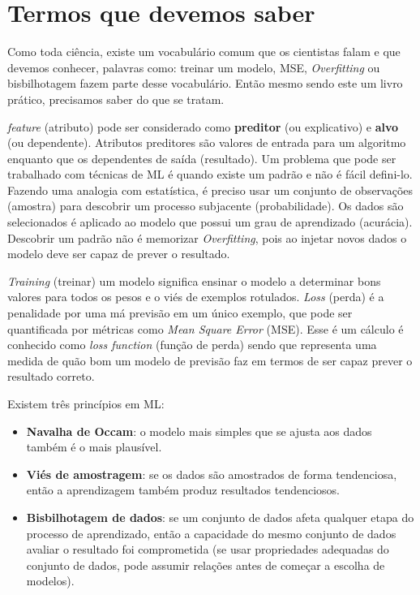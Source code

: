 \section{Termos que devemos saber}
Como toda ciência, existe um vocabulário comum que os cientistas falam e que devemos conhecer, palavras como: treinar um modelo, MSE, \textit{Overfitting} ou bisbilhotagem fazem parte desse vocabulário. Então mesmo sendo este um livro prático, precisamos saber do que se tratam.

\textit{feature} (atributo) pode ser considerado como \textbf{preditor} (ou explicativo) e \textbf{alvo} (ou dependente). Atributos preditores são valores de entrada para um algoritmo enquanto que os dependentes de saída (resultado). Um problema que pode ser trabalhado com técnicas de ML é quando existe um padrão e não é fácil defini-lo. Fazendo uma analogia com estatística, é preciso usar um conjunto de observações (amostra) para descobrir um processo subjacente (probabilidade). Os dados são selecionados é aplicado ao modelo que possui um grau de aprendizado (acurácia). Descobrir um padrão não é memorizar \textit{Overfitting}, pois ao injetar novos dados o modelo deve ser capaz de prever o resultado. 

\textit{Training} (treinar) um modelo significa ensinar o modelo a determinar bons valores para todos os pesos e o viés de exemplos rotulados. \textit{Loss} (perda) é a penalidade por uma má previsão em um único exemplo, que pode ser quantificada por métricas como \textit{Mean Square Error} (MSE). Esse é um cálculo é conhecido como \textit{loss function} (função de perda) sendo que representa uma medida de quão bom um modelo de previsão faz em termos de ser capaz prever o resultado correto.

Existem três princípios em ML: \vspace{-1em}
\begin{itemize}
	\item \textbf{Navalha de Occam}: o modelo mais simples que se ajusta aos dados também é o mais plausível.
	\item \textbf{Viés de amostragem}: se os dados são amostrados de forma tendenciosa, então a aprendizagem também produz resultados tendenciosos.
	\item \textbf{Bisbilhotagem de dados}: se um conjunto de dados afeta qualquer etapa do processo de aprendizado, então a capacidade do mesmo conjunto de dados avaliar o resultado foi comprometida (se usar propriedades adequadas do conjunto de dados, pode assumir relações antes de começar a escolha de modelos).
\end{itemize}

